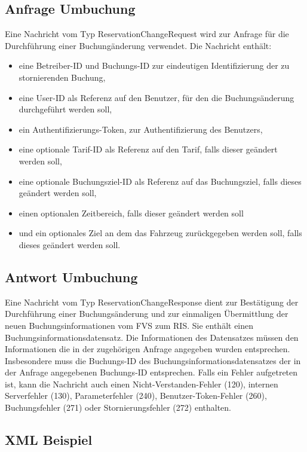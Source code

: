 \subsection{Anfrage Umbuchung}
Eine Nachricht vom Typ ReservationChangeRequest wird zur Anfrage für die Durchführung einer Buchungänderung verwendet. Die Nachricht enthält:
\begin{itemize}
\item eine Betreiber-ID und Buchungs-ID zur eindeutigen Identifizierung der zu stornierenden Buchung,
\item eine User-ID als Referenz auf den Benutzer, für den die Buchungsänderung durchgeführt werden soll,
\item ein Authentifizierungs-Token, zur Authentifizierung des Benutzers,
\item eine optionale Tarif-ID als Referenz auf den Tarif, falls dieser geändert werden soll,
\item eine optionale Buchungsziel-ID als Referenz auf das Buchungsziel, falls dieses geändert werden soll,
\item einen optionalen Zeitbereich, falls dieser geändert werden soll
\item und ein optionales Ziel an dem das Fahrzeug zurückgegeben werden soll, falls dieses geändert werden soll.
\end{itemize}



\subsection{Antwort Umbuchung}
Eine Nachricht vom Typ ReservationChangeResponse dient zur Bestätigung der Durchführung einer Buchungsänderung und zur einmaligen Übermittlung der neuen Buchungsinformationen vom FVS zum RIS. Sie enthält einen Buchungsinformationsdatensatz. Die Informationen des Datensatzes müssen den Informationen die in der zugehörigen Anfrage angegeben wurden entsprechen. Insbesondere muss die Buchungs-ID des Buchungsinformationsdatensatzes der in der Anfrage angegebenen Buchungs-ID entsprechen. Falls ein Fehler aufgetreten ist, kann die Nachricht auch einen Nicht-Verstanden-Fehler (120), internen Serverfehler (130), Parameterfehler (240), Benutzer-Token-Fehler (260), Buchungsfehler (271) oder Stornierungsfehler (272) enthalten.



\subsection{XML Beispiel}
